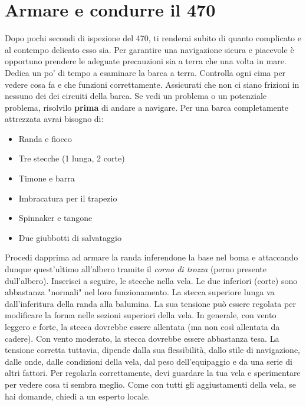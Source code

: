 \renewcommand{\sectionsPath}{RegolazioneDellaBarca}

\chapter{Armare e condurre il 470}
\label{ch:RegolazioneDellaBarca}
Dopo pochi secondi di ispezione del 470, ti renderai subito di quanto complicato
e al contempo delicato esso sia. Per garantire una navigazione sicura e
piacevole è opportuno prendere le adeguate precauzioni sia a terra che una volta
in mare. Dedica un po' di tempo a esaminare la barca a terra. Controlla ogni cima per vedere cosa fa e che funzioni correttamente.
Assicurati che non ci siano frizioni in nessuno dei dei circuiti della
barca. Se vedi un problema o un potenziale problema, risolvilo \textbf{prima} di andare a
navigare. Per una barca completamente attrezzata avrai bisogno di:
\begin{itemize}
    \item Randa e fiocco
    \item Tre stecche (1 lunga, 2 corte)
    \item Timone e barra
    \item Imbracatura per il trapezio
    \item Spinnaker e tangone
    \item Due giubbotti di salvataggio
\end{itemize}
Procedi dapprima ad armare la randa inferendone la base nel boma e attaccando
dunque quest'ultimo all'albero tramite il \emph{corno di trozza} (perno presente
dull'albero). Inserisci a seguire, le stecche nella vela. Le due inferiori (corte)
sono abbastanza "normali" nel loro funzionamento. La stecca superiore lunga va
dall'inferitura della randa alla balumina. La sua tensione può essere regolata
per modificare la forma nelle sezioni superiori
della vela. In generale, con vento leggero e forte, la stecca dovrebbe essere
allentata (ma non così allentata da cadere). Con vento moderato, la stecca
dovrebbe essere abbastanza tesa. La tensione corretta tuttavia, dipende
dalla sua flessibilità, dallo stile di navigazione, dalle onde, dalle
condizioni della vela, dal peso dell'equipaggio e da una serie di altri fattori.
Per regolarla correttamente, devi guardare la tua vela e sperimentare per vedere
cosa ti sembra meglio. Come con tutti gli aggiustamenti della vela, se
hai domande, chiedi a un esperto locale.

